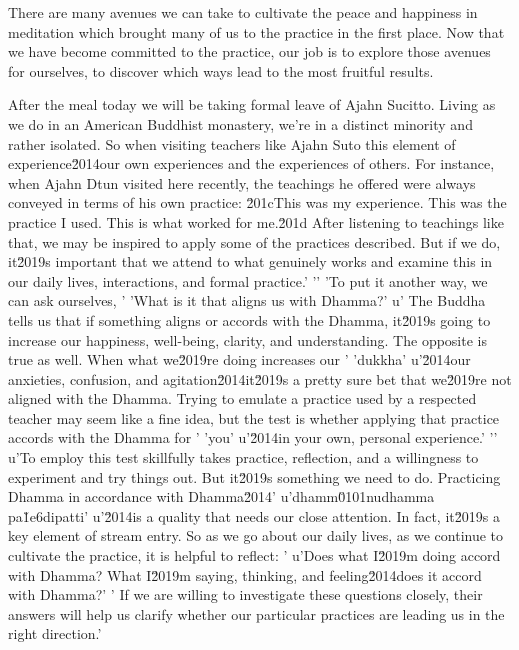 There are many avenues we can take to cultivate the peace and happiness 
in meditation which brought many of us to the practice in the first 
place. Now that we have become committed to the practice, our job is to 
explore those avenues for ourselves, to discover which ways lead to the 
most fruitful results.


After the meal today we will be taking formal leave of Ajahn Sucitto. 
Living as we do in an American Buddhist monastery, we're in a distinct 
minority and rather isolated. So when visiting teachers like Ajahn 
Suto this element of experience\u2014our own experiences and the experiences of others. For instance, when Ajahn Dtun visited here recently, the teachings he offered were always conveyed in terms of his own practice: \u201cThis was my experience. This was the practice I used. This is what worked for me.\u201d After listening to teachings like that, we may be inspired to apply some of the practices described. But if we do, it\u2019s important that we attend to what genuinely works and examine this in our daily lives, interactions, and formal practice.'
'\n'
'To put it another way, we can ask ourselves, '
'What is it that aligns us with Dhamma?'
u' The Buddha tells us that if something aligns or accords with the Dhamma, it\u2019s going to increase our happiness, well-being, clarity, and understanding. The opposite is true as well. When what we\u2019re doing increases our '
'dukkha'
u'\u2014our anxieties, confusion, and agitation\u2014it\u2019s a pretty sure bet that we\u2019re not aligned with the Dhamma. Trying to emulate a practice used by a respected teacher may seem like a fine idea, but the test is whether applying that practice accords with the Dhamma for '
'you'
u'\u2014in your own, personal experience.'
'\n'
u'To employ this test skillfully takes practice, reflection, and a willingness to experiment and try things out. But it\u2019s something we need to do. Practicing Dhamma in accordance with Dhamma\u2014'
u'dhamm\u0101nudhamma pa\u1e6dipatti'
u'\u2014is a quality that needs our close attention. In fact, it\u2019s a key element of stream entry. So as we go about our daily lives, as we continue to cultivate the practice, it is helpful to reflect: '
u'Does what I\u2019m doing accord with Dhamma? What I\u2019m saying, thinking, and feeling\u2014does it accord with Dhamma?'
' If we are willing to investigate these questions closely, their answers will help us clarify whether our particular practices are leading us in the right direction.'
